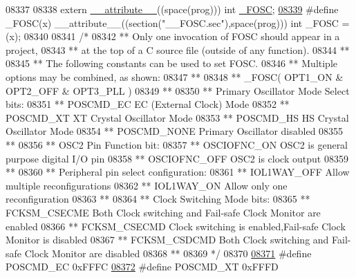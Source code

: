 \begin{DoxyCode}
{{{{08337 
08338 \textcolor{keyword}{extern} \hyperlink{a00015_a493c46f03454991ccc5aa7a6e1dfb2a7}{\_\_attribute\_\_}((space(prog))) int \hyperlink{a00015_a3b72a7757ab208ee35d0398426a4bca0}{\_FOSC};
\hypertarget{a00015_source_l08339}{}\hyperlink{a00015_a3b72a7757ab208ee35d0398426a4bca0}{08339} \textcolor{preprocessor}{#define \_FOSC(x) \_\_attribute\_\_((section("\_\_FOSC.sec"),space(prog))) int \_FOSC = (x);}
08340 
08341 \textcolor{comment}{/*}
08342 \textcolor{comment}{** Only one invocation of FOSC should appear in a project,}
08343 \textcolor{comment}{** at the top of a C source file (outside of any function).}
08344 \textcolor{comment}{**}
08345 \textcolor{comment}{** The following constants can be used to set FOSC.}
08346 \textcolor{comment}{** Multiple options may be combined, as shown:}
08347 \textcolor{comment}{**}
08348 \textcolor{comment}{** \_FOSC( OPT1\_ON & OPT2\_OFF & OPT3\_PLL )}
08349 \textcolor{comment}{**}
08350 \textcolor{comment}{**   Primary Oscillator Mode Select bits:}
08351 \textcolor{comment}{**     POSCMD\_EC            EC (External Clock) Mode}
08352 \textcolor{comment}{**     POSCMD\_XT            XT Crystal Oscillator Mode}
08353 \textcolor{comment}{**     POSCMD\_HS            HS Crystal Oscillator Mode}
08354 \textcolor{comment}{**     POSCMD\_NONE          Primary Oscillator disabled}
08355 \textcolor{comment}{**}
08356 \textcolor{comment}{**   OSC2 Pin Function bit:}
08357 \textcolor{comment}{**     OSCIOFNC\_ON          OSC2 is general purpose digital I/O pin}
08358 \textcolor{comment}{**     OSCIOFNC\_OFF         OSC2 is clock output}
08359 \textcolor{comment}{**}
08360 \textcolor{comment}{**   Peripheral pin select configuration:}
08361 \textcolor{comment}{**     IOL1WAY\_OFF          Allow multiple reconfigurations}
08362 \textcolor{comment}{**     IOL1WAY\_ON           Allow only one reconfiguration}
08363 \textcolor{comment}{**}
08364 \textcolor{comment}{**   Clock Switching Mode bits:}
08365 \textcolor{comment}{**     FCKSM\_CSECME         Both Clock switching and Fail-safe Clock Monitor are enabled}
08366 \textcolor{comment}{**     FCKSM\_CSECMD         Clock switching is enabled,Fail-safe Clock Monitor is disabled}
08367 \textcolor{comment}{**     FCKSM\_CSDCMD         Both Clock switching and Fail-safe Clock Monitor are disabled}
08368 \textcolor{comment}{**}
08369 \textcolor{comment}{*/}
08370 
\hypertarget{a00015_source_l08371}{}\hyperlink{a00015_a289cbd35334c9f85bd0b549a42a75b07}{08371} \textcolor{preprocessor}{#define POSCMD\_EC            0xFFFC}
\hypertarget{a00015_source_l08372}{}\hyperlink{a00015_a23bff3343c864819710aad75a8b03f8c}{08372} \textcolor{preprocessor}{#define POSCMD\_XT            0xFFFD}
}}}}
\end{DoxyCode}
